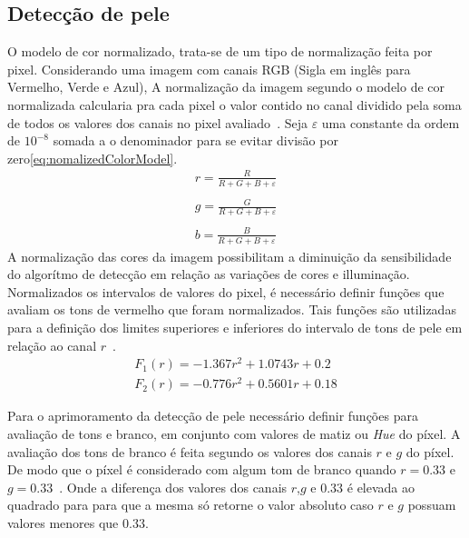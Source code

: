 \documentclass[journal,onecolumn]{IEEEtran}
\begin{document}
	\subsection{Detecção de pele}
	\label{subsec:deteccaoPele}
	O modelo de cor normalizado, trata-se de um tipo de normalização feita por pixel. 
	Considerando uma imagem com canais RGB (Sigla em inglês para Vermelho, Verde e Azul), 
	A normalização da imagem segundo o modelo de cor normalizada calcularia pra cada pixel o valor contido no canal dividido pela soma de todos os valores dos canais no pixel avaliado~\cite{chen2007simple,loesdau2017chromatic}. 
	Seja $\varepsilon$ uma constante da ordem de $10^{-8}$ somada a o denominador para se evitar divisão por zero\eqref{eq:nomalizedColorModel}.	
	\begin{equation}
		\begin{split}
			r  = \frac{R}{R+G+B+\varepsilon} \\\\
			g  = \frac{G}{R+G+B+\varepsilon} \\\\
			b  = \frac{B}{R+G+B+\varepsilon}
			\label{eq:nomalizedColorModel}
		\end{split}
	\end{equation}		
	A normalização das cores da imagem possibilitam a diminuição da sensibilidade do algorítmo de detecção em relação as variações de cores e illuminação.
	Normalizados os intervalos de valores do pixel, é necessário definir funções que avaliam os tons de vermelho  que foram normalizados.
	Tais funções são utilizadas para a definição dos limites superiores e inferiores do intervalo de tons de pele em relação ao canal $r$~\cite{soriano2000using,chen2007simple}.
	\begin{equation}
		\begin{split}
			F_1(r)  = -1.367r^2 + 1.0743r + 0.2 \\
			F_2(r)  = -0.776r^2 + 0.5601r + 0.18
		\end{split}
	\end{equation}
	
	Para o aprimoramento da detecção de pele necessário definir funções para avaliação de tons e branco, em conjunto com valores de matiz ou \textit{Hue} do píxel.
	A avaliação dos tons de branco é feita segundo os valores dos canais $r$ e $g$ do píxel. 
	De modo que o píxel é considerado com algum tom de branco quando $r=0.33$ e $g=0.33$~\cite{chen2007simple}.
	Onde a diferença dos valores dos canais $r$,$g$ e $0.33$ é elevada ao quadrado para para que a mesma só retorne o valor absoluto caso $r$ e $g$ possuam valores menores que $0.33$.
	
\end{document}
